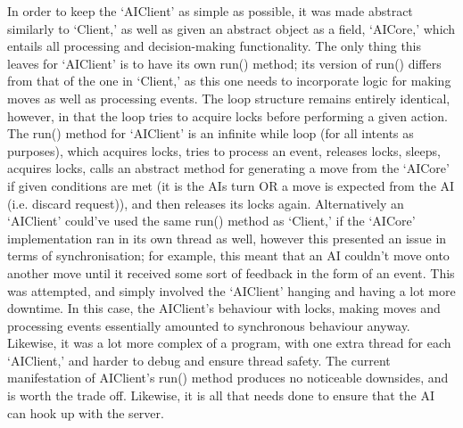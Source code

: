 \documentclass[a4paper,doc,draftfirst]{apa6}
\begin{document}
In order to keep the ‘AIClient’ as simple as possible, it was made abstract similarly to ‘Client,’ as well as given an abstract object as a field, ‘AICore,’ which entails all processing and decision-making functionality. The only thing this leaves for ‘AIClient’ is to have its own run() method; its version of run() differs from that of the one in ‘Client,’ as this one needs to incorporate logic for making moves as well as processing events. The loop structure remains entirely identical, however, in that the loop tries to acquire locks before performing a given action. The run() method for ‘AIClient’ is an infinite while loop (for all intents as purposes), which acquires locks, tries to process an event, releases locks, sleeps, acquires locks, calls an abstract method for generating a move from the ‘AICore’ if given conditions are met (it is the AIs turn OR a move is expected from the AI (i.e. discard request)), and then releases its locks again. Alternatively an ‘AIClient’ could’ve used the same run() method as ‘Client,’ if the ‘AICore’ implementation ran in its own thread as well, however this presented an issue in terms of synchronisation; for example, this meant that an AI couldn’t move onto another move until it received some sort of feedback in the form of an event. This was attempted, and simply involved the ‘AIClient’ hanging and having a lot more downtime. In this case, the AIClient’s behaviour with locks, making moves and processing events essentially amounted to synchronous behaviour anyway. Likewise, it was a lot more complex of a program, with one extra thread for each ‘AIClient,’ and harder to debug and ensure thread safety. The current manifestation of AIClient’s run() method produces no noticeable downsides, and is worth the trade off. Likewise, it is all that needs done to ensure that the AI can hook up with the server.
\end{document}

